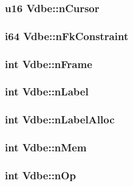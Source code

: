 \subsubsection{\setlength{\rightskip}{0pt plus 5cm}\bf{u16} \bf{Vdbe::n\-Cursor}}\label{structVdbe_4a4db4585d14b044e32ca36df5fa5afd}


\subsubsection{\setlength{\rightskip}{0pt plus 5cm}\bf{i64} \bf{Vdbe::n\-Fk\-Constraint}}\label{structVdbe_75af5a04705083e7527182a2db283ba4}


\subsubsection{\setlength{\rightskip}{0pt plus 5cm}int \bf{Vdbe::n\-Frame}}\label{structVdbe_aeb11e330a5b313789db4b5076c2c70b}


\subsubsection{\setlength{\rightskip}{0pt plus 5cm}int \bf{Vdbe::n\-Label}}\label{structVdbe_77a27c3c8e1dde22e2456f4ca9d057cd}


\subsubsection{\setlength{\rightskip}{0pt plus 5cm}int \bf{Vdbe::n\-Label\-Alloc}}\label{structVdbe_d27c2fdb6b4c784974ad8ff48e980b6e}


\subsubsection{\setlength{\rightskip}{0pt plus 5cm}int \bf{Vdbe::n\-Mem}}\label{structVdbe_82bfaf7bb23e0a16bcbf16856a508efc}


\subsubsection{\setlength{\rightskip}{0pt plus 5cm}int \bf{Vdbe::n\-Op}}\label{structVdbe_999ec18a15c3dbbcb9e8e689b092a803}


